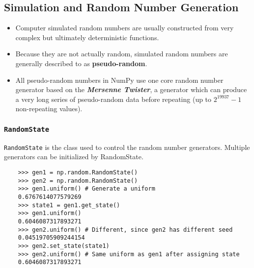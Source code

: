 \documentclass[Pydata.tex]{subfiles}
\begin{document}
%


\newpage

\subsection{Simulation and Random Number Generation}
\begin{itemize}
\item Computer simulated random numbers are usually constructed from very complex but ultimately deterministic
functions. 
\item Because they are not actually random, simulated random numbers are generally described
to as \textbf{pseudo-random}. 
\item All pseudo-random numbers in NumPy use one core random number generator
based on the \textbf{\textit{Mersenne Twister}}, a generator which can produce a very long series of pseudo-random
data before repeating (up to $2^19937 - 1$ non-repeating values).
\end{itemize}

\subsubsection{\texttt{RandomState}}
\texttt{RandomState} is the class used to control the random number generators. Multiple generators can be initialized
by RandomState.
\begin{framed}
	\begin{verbatim}
	>>> gen1 = np.random.RandomState()
	>>> gen2 = np.random.RandomState()
	>>> gen1.uniform() # Generate a uniform
	0.6767614077579269
	>>> state1 = gen1.get_state()
	>>> gen1.uniform()
	0.6046087317893271
	>>> gen2.uniform() # Different, since gen2 has different seed
	0.04519705909244154
	>>> gen2.set_state(state1)
	>>> gen2.uniform() # Same uniform as gen1 after assigning state
	0.6046087317893271
	\end{verbatim}
\end{framed}
\end{document}
